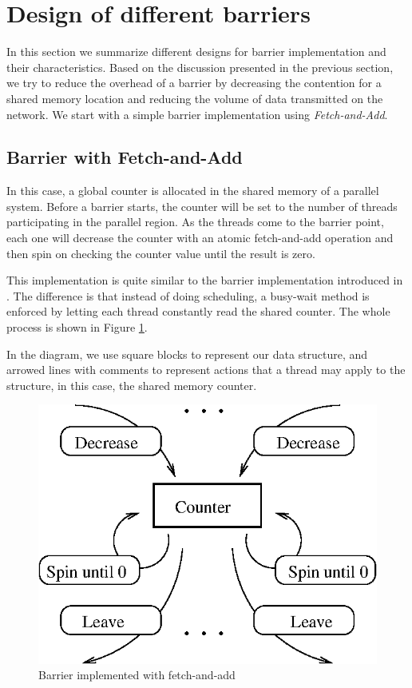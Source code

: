 
\section{Design of different barriers}
\label{design}

In this section we summarize different designs for barrier
implementation and their characteristics. Based on the discussion presented
in the previous section, we try to reduce the overhead of a barrier
by decreasing the contention for a shared memory location
and reducing the volume of data transmitted on the network.
We start with a simple barrier implementation using \emph{Fetch-and-Add}.

\subsection{Barrier with Fetch-and-Add}
\label{sec:fetchandadd}

In this case, a global counter is allocated in the shared memory of a
parallel system. Before a barrier starts, the counter will be set to
the number of threads participating in the parallel region. As the
threads come to the barrier point, each one will decrease the counter
with an atomic fetch-and-add operation and then spin on
checking the counter value until the result is zero.

This implementation is quite similar to the barrier implementation
introduced in
\cite{IBM92}. The difference is that instead of doing scheduling, a
busy-wait method is enforced by letting each thread constantly read
the shared counter. The whole process is shown in Figure
\ref{fig:fetchandadd}. 

In the diagram, we use square blocks to represent our data structure,
and arrowed lines with comments to represent actions that a thread may
apply to the structure, in this case, the shared memory counter.

\begin{figure}[htbp]
  \begin{center}
    \includegraphics[angle=0, scale=.85]{fetchandadd.eps}
    \caption{Barrier implemented with fetch-and-add}
    \label{fig:fetchandadd}
  \end{center}
\end{figure}

